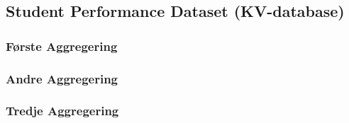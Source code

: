 \subsection{Student Performance Dataset (KV-database)}

\subsubsection{Første Aggregering}

\subsubsection{Andre Aggregering}

\subsubsection{Tredje Aggregering}
